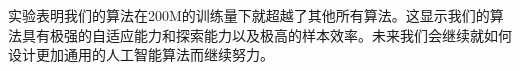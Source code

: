 实验表明我们的算法在200M的训练量下就超越了其他所有算法。这显示我们的算法具有极强的自适应能力和探索能力以及极高的样本效率。未来我们会继续就如何设计更加通用的人工智能算法而继续努力。












